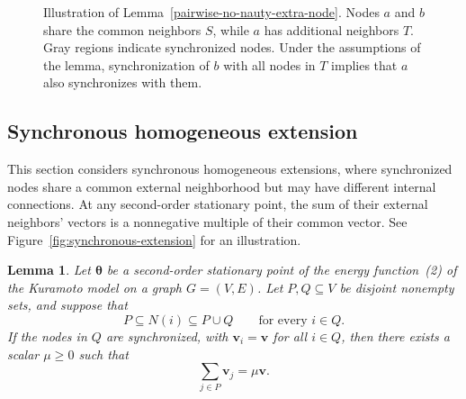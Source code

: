 \documentclass[11pt,reqno]{amsart}
\newtheorem{lemma}[theorem]{Lemma}
\theoremstyle{definition}
\begin{document}
\begin{figure}[H]

\caption{Illustration of Lemma~\ref{pairwise-no-nauty-extra-node}.
Nodes $a$ and $b$ share the common neighbors $S$, while $a$
has additional neighbors $T$. Gray regions indicate synchronized
nodes. Under the assumptions of the lemma, synchronization of
$b$ with all nodes in $T$ implies that $a$ also synchronizes
with them.}
    \label{fig:lemma5_3}
\end{figure}


\subsection{Synchronous homogeneous extension}
This section considers synchronous homogeneous extensions,
where synchronized nodes share a common external neighborhood
but may have different internal connections.
At any second-order stationary point, the sum of their external
neighbors' vectors is a nonnegative multiple of their common vector. See Figure~\ref{fig:synchronous-extension}
for an illustration.
\begin{lemma}\label{lem:opentwins}
Let $\boldsymbol\theta$ be a second-order stationary point of the energy
function~(2) of the Kuramoto model on a graph $G=(V,E)$.
Let $P,Q\subseteq V$ be disjoint nonempty sets,
and suppose that
\[
    P\subseteq N(i)\subseteq P\cup Q
    \qquad \text{for every } i\in Q.
\]
If the nodes in $Q$ are synchronized, with
$\mathbf{v}_i=\mathbf{v}$ for all $i\in Q$, then there exists
a scalar $\mu\geq 0$ such that
\[
    \sum_{j\in P}\mathbf{v}_j=\mu\mathbf{v}.
\]
\end{lemma}
\end{document}
